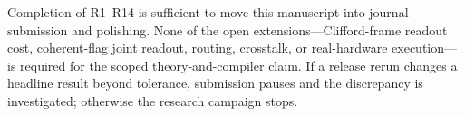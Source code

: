 \documentclass[11pt]{article}
\theoremstyle{definition}
\theoremstyle{remark}
\begin{document}
\begin{claimbox}[title={Submission decision}]
Completion of R1--R14 is sufficient to move this manuscript into journal submission and polishing. None of the open extensions---Clifford-frame readout cost, coherent-flag joint readout, routing, crosstalk, or real-hardware execution---is required for the scoped theory-and-compiler claim. If a release rerun changes a headline result beyond tolerance, submission pauses and the discrepancy is investigated; otherwise the research campaign stops.
\end{claimbox}

\printbibliography
\end{document}
